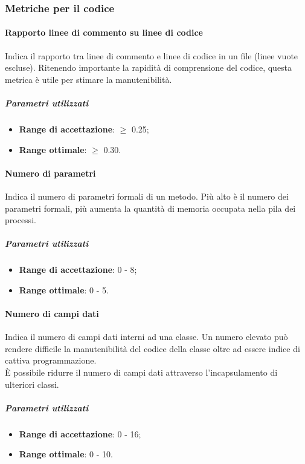 \documentclass[../PianoDiQualifica.tex]{subfiles}
\begin{document}
			\subsubsection{Metriche per il codice}\label{MetrichePerIlCodice}
				\paragraph{Rapporto linee di commento su linee di codice\\}
					Indica il rapporto tra linee di commento e linee di codice in un
					file (linee vuote escluse). Ritenendo importante la rapidità di
					comprensione del codice, questa metrica è utile per stimare la
					manutenibilità.
					\subparagraph{Parametri utilizzati}
						\begin{itemize}
							\item \textbf{Range di accettazione}: $\geq$ 0.25;
							\item \textbf{Range ottimale}: $\geq$ 0.30.
						\end{itemize}
				\paragraph{Numero di parametri\\}
					Indica il numero di parametri formali di un metodo. Più alto è il
					numero dei parametri formali, più aumenta la quantità di memoria
					occupata nella pila dei processi.
					\subparagraph{Parametri utilizzati}
						\begin{itemize}
							\item \textbf{Range di accettazione}: 0 - 8;
							\item \textbf{Range ottimale}: 0 - 5.
						\end{itemize}
				\paragraph{Numero di campi dati\\}
					Indica il numero di campi dati interni ad una classe. Un numero
					elevato può rendere difficile la manutenibilità del codice della
					classe oltre ad essere indice di cattiva programmazione.\\
					È possibile ridurre il numero di campi dati attraverso
					l'incapsulamento di ulteriori classi.
					\subparagraph{Parametri utilizzati}
						\begin{itemize}
							\item \textbf{Range di accettazione}: 0 - 16;
							\item \textbf{Range ottimale}: 0 - 10.
						\end{itemize}
\end{document}
